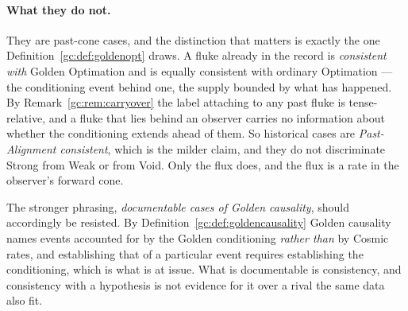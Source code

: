 \paragraph{What they do not.} They are past-cone cases, and the
distinction that matters is exactly the one
Definition~\ref{gc:def:goldenopt} draws. A fluke already in the record is
\emph{consistent with} Golden Optimation and is equally consistent with
ordinary Optimation --- the conditioning event behind one, the supply
bounded by what has happened. By Remark~\ref{gc:rem:carryover} the label
attaching to any past fluke is tense-relative, and a fluke that lies
behind an observer carries no information about whether the conditioning
extends ahead of them. So historical cases are \emph{Past-Alignment
consistent}, which is the milder claim, and they do not discriminate
Strong from Weak or from Void. Only the flux does, and the flux is a rate
in the observer's forward cone.

The stronger phrasing, \emph{documentable cases of Golden causality}, should accordingly be resisted. By
Definition~\ref{gc:def:goldencausality} Golden causality names events
accounted for by the Golden conditioning \emph{rather than} by Cosmic
rates, and establishing that of a particular event requires establishing
the conditioning, which is what is at issue. What is documentable is
consistency, and consistency with a hypothesis is not evidence for it
over a rival the same data also fit.

